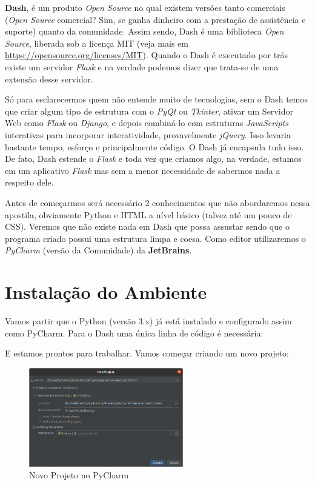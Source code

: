 \documentclass[a4paper,11pt]{article}
\begin{document}
\textbf{Dash}, é um produto \textit{Open Source} no qual existem versões tanto comerciais (\textit{Open Source} comercial? Sim, se ganha dinheiro com a prestação de assistência e suporte) quanto da comunidade. Assim sendo, Dash é uma biblioteca \textit{Open Source}, liberada sob a licença MIT (veja mais em \url{https://opensource.org/licenses/MIT}). Quando o Dash é executado por trás existe um servidor \textit{Flask} e na verdade podemos dizer que trata-se de uma extensão desse servidor.

Só para esclarecermos quem não entende muito de tecnologias, sem o Dash temos que criar algum tipo de estrutura com o \textit{PyQt} ou \textit{Tkinter}, ativar um Servidor Web como \textit{Flask} ou \textit{Django}, e depois combiná-lo com estruturas \textit{JavaScripts} interativas para incorporar interatividade, provavelmente \textit{jQuery}. Isso levaria bastante tempo, esforço e principalmente código. O Dash já encapsula tudo isso. De fato, Dash estende o \textit{Flask} e toda vez que criamos algo, na verdade, estamos em um aplicativo \textit{Flask} mas sem a menor necessidade de sabermos nada a respeito dele.

Antes de começarmos será necessário 2 conhecimentos que não abordaremos nessa apostila, obviamente Python e HTML a nível básico (talvez até um pouco de CSS). Veremos que não existe nada em Dash que possa assustar sendo que o programa criado possui uma estrutura limpa e coesa. Como editor utilizaremos o \textit{PyCharm} \cite{pycharmoficial} (versão da Comunidade) da \textbf{JetBrains}.

\section{Instalação do Ambiente}
Vamos partir que o Python (versão 3.x) já está instalado e configurado assim como PyCharm. Para o Dash uma única linha de código é necessária: \\

E estamos prontos para trabalhar. Vamos começar criando um novo projeto:
\begin{figure}[H]
	\centering
	\includegraphics[width=0.6\textwidth]{imagem/novoProjeto}
	\caption{Novo Projeto no PyCharm}
\end{figure}
\end{document}
